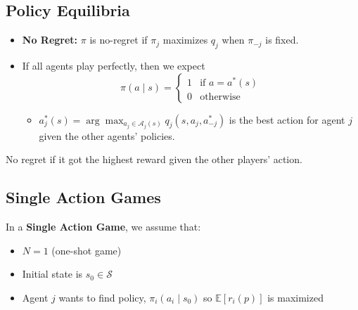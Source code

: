 \subsection{Policy Equilibria}
\begin{notes}
    \begin{itemize}
        \item \textbf{No Regret:} $\pi$ is no-regret if $\pi_j$ maximizes $q_j$ when $\pi_{-j}$ is fixed. 
        \item If all agents play perfectly, then we expect
        \begin{equation*}
            \pi (a \mid s) = \begin{cases}
                1 & \text{if } a= a^*(s) \\
                0 & \text{otherwise}
            \end{cases}
        \end{equation*}
        \begin{itemize}
            \item $a_j^*(s) = \arg \max_{a_j \in \mathcal{A}_j(s)} q_j(s,a_j,a_{-j}^*)$ is the best action for agent $j$ given the other agents' policies.
        \end{itemize}
    \end{itemize}
\end{notes}

\begin{warning}
    No regret if it got the highest reward given the other players' action. 
\end{warning}
\newpage

\subsection{Single Action Games}
\begin{summary}
    In a \textbf{Single Action Game}, we assume that:
    \begin{itemize}
        \item $N=1$ (one-shot game)
        \item Initial state is $s_0 \in \mathcal{S}$
        \item Agent $j$ wants to find policy, $\pi_i (a_i \mid s_0)$ so $\mathbb{E}[r_i(p)]$ is maximized
    \end{itemize}
\end{summary}

